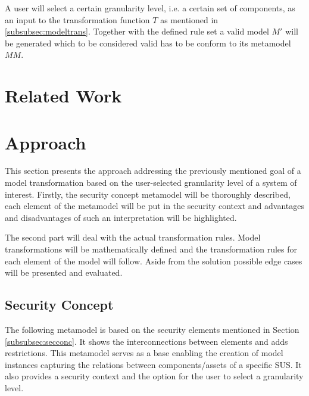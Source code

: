 A user will select a certain granularity level, i.e. a certain set of components, as an input to the transformation function $T$ as mentioned in \ref{subsubsec:modeltrans}. Together with the defined rule set a valid model $M'$ will be generated which to be considered valid has to be conform to its metamodel $MM$.

\section{Related Work}
\label{sec:related_work}

\section{Approach}
This section presents the approach addressing the previously mentioned goal of a model transformation based on the user-selected granularity level of a system of interest. Firstly, the security concept metamodel will be thoroughly described, each element of the metamodel will be put in the security context and advantages and disadvantages of such an interpretation will be highlighted.

The second part will deal with the actual transformation rules. Model transformations will be mathematically defined and the transformation rules for each element of the model will follow. Aside from the solution possible edge cases will be presented and evaluated.

\label{sec:approach}
\subsection{Security Concept}

The following metamodel is based on the security elements mentioned in Section \ref{subsubsec:secconc}. It shows the interconnections between elements and adds restrictions. This metamodel serves as a base enabling the creation of model instances capturing the relations between components/assets of a specific SUS. It also provides a security context and the option for the user to select a granularity level. 

